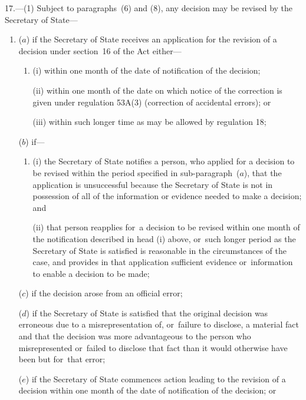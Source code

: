 \documentclass[a4paper,12pt]{article}
\begin{document}
17.—(1) Subject to paragraphs~(6) and (8), any decision may be revised by the Secretary of State---
\begin{enumerate}\item[]
($a$) if the Secretary of State receives an application for the revision of a decision under section~16 of the Act 
either—
\begin{enumerate}\item[]
(i) within one month of the date of notification of the decision;

(ii) within one month of the date on which notice of the correction is given under regulation 53A(3) (correction of accidental errors); or

(iii) within such longer time as may be allowed by regulation 18;
\end{enumerate}  %

($b$) if---
\begin{enumerate}\item[]
(i) the Secretary of State notifies a person, who applied for a decision to be revised within the period specified in sub-paragraph~($a$), that the application is unsuccessful because the Secretary of State is not in possession of all of the information or evidence needed to make a decision; and

(ii) that person reapplies for~a decision to be revised within one month of the notification described in head (i) above, or~such longer period as the Secretary of State is satisfied is reasonable in the circumstances of the case, and provides in that application sufficient evidence or~information to enable a decision to be made;
\end{enumerate}

($c$) if the decision arose from an official error;

($d$) if the Secretary of State is satisfied that the original decision was erroneous due to a misrepresentation of, or~failure to disclose, a material fact and that the decision was more advantageous to the person who misrepresented or~failed to disclose that fact than it would otherwise have been but for~that error; 

($e$) if the Secretary of State commences action leading to the revision of a decision within one month of the date of notification of the decision;
%
or


\end{enumerate}
\end{document}
